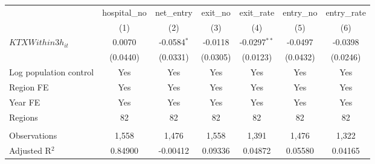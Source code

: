 \begingroup
\centering
\begin{tabular}{lcccccc}
   \toprule
                          & hospital\_no  & net\_entry    & exit\_no  & exit\_rate     & entry\_no  & entry\_rate \\    
                          & (1)           & (2)           & (3)       & (4)            & (5)        & (6)\\  
   \midrule 
   $KTXWithin3h_{it}$     & 0.0070        & -0.0584$^{*}$ & -0.0118   & -0.0297$^{**}$ & -0.0497    & -0.0398\\   
                          & (0.0440)      & (0.0331)      & (0.0305)  & (0.0123)       & (0.0432)   & (0.0246)\\   
   Log population control & Yes           & Yes           & Yes       & Yes            & Yes        & Yes\\  
   Region FE              & Yes           & Yes           & Yes       & Yes            & Yes        & Yes\\  
   Year FE                & Yes           & Yes           & Yes       & Yes            & Yes        & Yes\\  
   Regions                & 82            & 82            & 82        & 82             & 82         & 82\\  
    \\
   Observations           & 1,558         & 1,476         & 1,558     & 1,391          & 1,476      & 1,322\\  
   Adjusted R$^2$         & 0.84900       & -0.00412      & 0.09336   & 0.04872        & 0.05580    & 0.04165\\  
   \bottomrule
\end{tabular}
\par\endgroup
